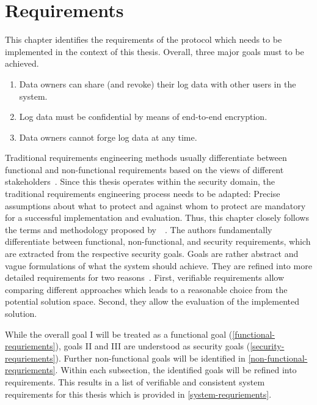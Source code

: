 \documentclass[../main.tex]{subfiles}
\begin{document}
\chapter{Requirements}
\label{chap:requirements}

This chapter identifies the requirements of the protocol which needs to be implemented in the context of this thesis.
Overall, three major goals must to be achieved. 

\begin{enumerate}[label=\Roman*.]
    \item Data owners can share (and revoke) their log data with other users in the system.
	\item Log data must be confidential by means of end-to-end encryption.
    \item Data owners cannot forge log data at any time.
\end{enumerate}

Traditional requirements engineering methods usually differentiate between functional and non-functional requirements based on the views of different stakeholders~\cite{Rehman2013}.
Since this thesis operates within the security domain, the traditional requirements engineering process needs to be adapted: 
Precise assumptions about what to protect and against whom to protect are mandatory for a successful implementation and evaluation.
Thus, this chapter closely follows the terms and methodology proposed by~\citeauthor{Fabian2010}~\cite{Fabian2010}.
The authors fundamentally differentiate between functional, non-functional, and security requirements, which are extracted from the respective security goals.
Goals are rather abstract and vague formulations of what the system should achieve. 
They are refined into more detailed requirements for two reasons~\cite{Fabian2010}.
First, verifiable requirements allow comparing different approaches which leads to a reasonable choice from the potential solution space.
Second, they allow the evaluation of the implemented solution.

While the overall goal I will be treated as a functional goal (\cref{functional-requriements}), goals II and III are understood as security goals (\cref{security-requriements}).
Further non-functional goals will be identified in \cref{non-functional-requriements}.
Within each subsection, the identified goals will be refined into requirements.
This results in a list of verifiable and consistent system requirements for this thesis which is provided in \cref{system-requriements}.
\end{document}
